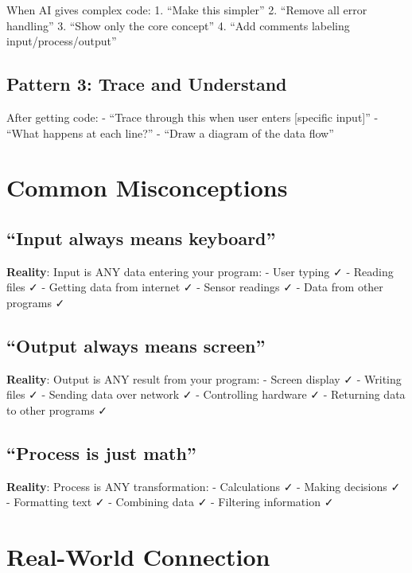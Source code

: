 \documentclass[
  letterpaper,
  DIV=11,
  numbers=noendperiod,
  oneside]{scrreprt}
\begin{document}
When AI gives complex code: 1. ``Make this simpler'' 2. ``Remove all
error handling'' 3. ``Show only the core concept'' 4. ``Add comments
labeling input/process/output''

\subsection{Pattern 3: Trace and
Understand}\label{pattern-3-trace-and-understand}

After getting code: - ``Trace through this when user enters {[}specific
input{]}'' - ``What happens at each line?'' - ``Draw a diagram of the
data flow''

\section{Common Misconceptions}\label{common-misconceptions}

\subsection{``Input always means
keyboard''}\label{input-always-means-keyboard}

\textbf{Reality}: Input is ANY data entering your program: - User typing
✓ - Reading files ✓ - Getting data from internet ✓ - Sensor readings ✓ -
Data from other programs ✓

\subsection{``Output always means
screen''}\label{output-always-means-screen}

\textbf{Reality}: Output is ANY result from your program: - Screen
display ✓ - Writing files ✓ - Sending data over network ✓ - Controlling
hardware ✓ - Returning data to other programs ✓

\subsection{``Process is just math''}\label{process-is-just-math}

\textbf{Reality}: Process is ANY transformation: - Calculations ✓ -
Making decisions ✓ - Formatting text ✓ - Combining data ✓ - Filtering
information ✓

\section{Real-World Connection}\label{real-world-connection}
\end{document}
